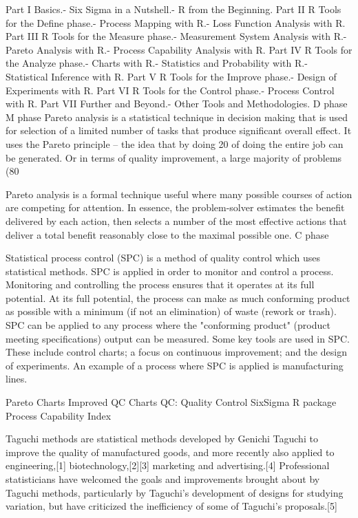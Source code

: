 
Part I Basics.- Six Sigma in a Nutshell.- R from the Beginning.
Part II R Tools for the Define phase.- Process Mapping with R.- Loss Function Analysis with R.
Part III R Tools for the Measure phase.- Measurement System Analysis with R.- Pareto Analysis with R.- Process Capability Analysis with R.
Part IV R Tools for the Analyze phase.- Charts with R.- Statistics and Probability with R.- Statistical Inference with R.
Part V R Tools for the Improve phase.- Design of Experiments with R.
Part VI R Tools for the Control phase.- Process Control with R.
Part VII Further and Beyond.- Other Tools and Methodologies.
D phase
M phase
Pareto analysis is a statistical technique in decision making that is used for selection of a limited number of tasks that
produce significant overall effect. It uses the Pareto principle – the idea that by doing 20%
of doing the entire job can be generated.  Or in terms of quality improvement, a large majority of problems (80%
 
Pareto analysis is a formal technique useful where many possible courses of action are competing for attention.
In essence, the problem-solver estimates the benefit delivered by each action, then selects a number of the most
effective actions that deliver a total benefit reasonably close to the maximal possible one.
C phase

Statistical process control (SPC) is a method of quality control which uses statistical methods. SPC is applied in order to monitor and control a process. Monitoring and controlling the process ensures that it operates at its full potential. At its full potential, the process can make as much conforming product as possible with a minimum (if not an elimination) of waste (rework or trash). SPC can be applied to any process where the "conforming product" (product meeting specifications) output can be measured. Some key tools are used in SPC. These include control charts; a focus on continuous improvement; and the design of experiments.
An example of a process where SPC is applied is manufacturing lines.

Pareto Charts
Improved QC Charts
QC: Quality Control
SixSigma R package
Process Capability Index

Taguchi methods are statistical methods developed by Genichi Taguchi to improve the quality of manufactured goods, and more recently also applied to engineering,[1] biotechnology,[2][3] marketing and advertising.[4] Professional statisticians have welcomed the goals and improvements brought about by Taguchi methods, particularly by Taguchi's development of designs for studying variation, but have criticized the inefficiency of some of Taguchi's proposals.[5]
 
